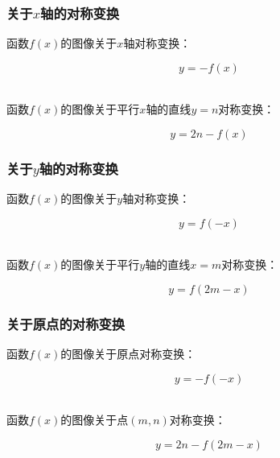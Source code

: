 \documentclass[UTF8]{ctexart}
\begin{document}
\newpage

\subsubsection{关于$x$轴的对称变换}
    函数$f(x)$的图像关于$x$轴对称变换：
    \begin{large}
        \begin{equation*}
            y=-f(x)
        \end{equation*}
    \end{large}\\
    函数$f(x)$的图像关于平行$x$轴的直线$y=n$对称变换：
    \begin{large}
        \begin{equation*}
                y=2n-f(x)
        \end{equation*}
    \end{large}

\subsubsection{关于$y$轴的对称变换}
    函数$f(x)$的图像关于$y$轴对称变换：
    \begin{large}
        \begin{equation*}
            y=f(-x)
        \end{equation*}
    \end{large}\\
    函数$f(x)$的图像关于平行$y$轴的直线$x=m$对称变换：
    \begin{large}
        \begin{equation*}
                y=f(2m-x)
        \end{equation*}
    \end{large}

\subsubsection{关于原点的对称变换}
    函数$f(x)$的图像关于原点对称变换：
    \begin{large}
        \begin{equation*}
                y=-f(-x)
        \end{equation*}
    \end{large}\\
    函数$f(x)$的图像关于点$(m,n)$对称变换：
    \begin{large}
        \begin{equation*}
                y=2n-f(2m-x)
        \end{equation*}
    \end{large}
\end{document}
